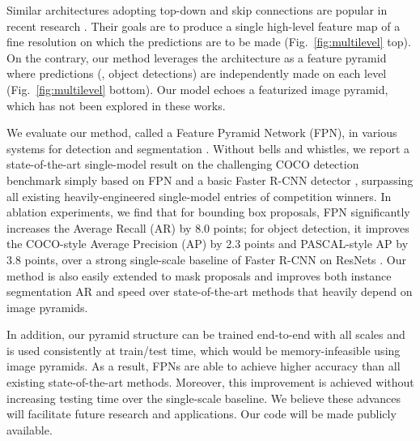 \documentclass[10pt,twocolumn,letterpaper]{article}
\begin{document}
Similar architectures adopting top-down and skip connections are popular in recent research \cite{Pinheiro2016,Honari2016,Ghiasi2016,Newell2016}.
Their goals are to produce a single high-level feature map of a fine resolution on which the predictions are to be made (Fig.~\ref{fig:multilevel} top).
On the contrary, our method leverages the architecture as a feature pyramid where predictions (\eg, object detections) are independently made on each level (Fig.~\ref{fig:multilevel} bottom). Our model echoes a featurized image pyramid, which has not been explored in these works.

We evaluate our method, called a Feature Pyramid Network (FPN), in various systems for detection and segmentation \cite{Girshick2015a,Ren2015a,Pinheiro2015}.
Without bells and whistles, we report a state-of-the-art single-model result on the challenging COCO detection benchmark \cite{Lin2014} simply based on FPN and a basic Faster R-CNN detector \cite{Ren2015a}, surpassing all existing heavily-engineered single-model entries of competition winners. 
In ablation experiments, we find that for bounding box proposals, FPN significantly increases the Average Recall (AR) by 8.0 points; for object detection, it improves the COCO-style Average Precision (AP) by 2.3 points and PASCAL-style AP by 3.8 points, over a strong single-scale baseline of Faster R-CNN on ResNets \cite{He2016}.
Our method is also easily extended to mask proposals and improves both instance segmentation AR and speed over state-of-the-art methods that heavily depend on image pyramids.

In addition, our pyramid structure can be trained end-to-end with all scales and is used consistently at train/test time, which would be memory-infeasible using image pyramids.
As a result, FPNs are able to achieve higher accuracy than all existing state-of-the-art methods.
Moreover, this improvement is achieved without increasing testing time over the single-scale baseline.
We believe these advances will facilitate future research and applications.
Our code will be made publicly available.
\end{document}
